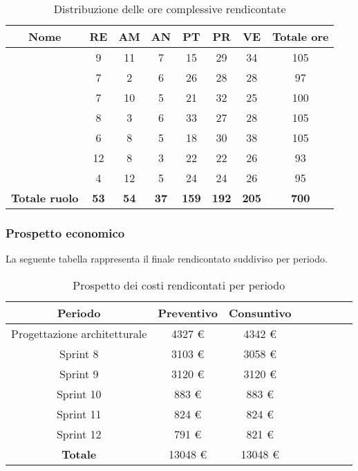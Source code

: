 \begin{table}[H]
		\begin{center}
			\setlength{\aboverulesep}{0pt}
			\setlength{\belowrulesep}{0pt}
			\setlength{\extrarowheight}{.75ex}
			\begin{tabular}{ c c c c c c c c }
				\rowcolor{AzzurroGruppo!30} 
				\textbf{Nome} & \textbf{RE} & \textbf{AM} & \textbf{AN} & \textbf{PT} & \textbf{PR} & \textbf{VE} & \textbf{Totale ore}\\
				\toprule
				\Davide{}    & 9 & 11 & 7 & 15 & 29 & 34 & 105 \\
				\Giosue{}    & 7 & 2 & 6 & 26 & 28 & 28 & 97\\
				\Francesco{} & 7 & 10 & 5 & 21 & 32 & 25 & 100\\
				\Daniele{}   & 8 & 3 & 6 & 33 & 27 & 28 & 105\\
				\Lucrezia{}  & 6 & 8 & 5 & 18 & 30 & 38 & 105\\
				\Matteo{}   & 12 & 8 & 3 & 22 & 22 & 26 & 93\\
				\Tommaso{}   & 4 & 12 & 5 & 24 & 24 & 26 & 95\\
				\textbf{Totale ruolo} & \textbf{53} & \textbf{54} & \textbf{37} & \textbf{159} & \textbf{192} & \textbf{205} & \textbf{700} \\
				\bottomrule
			\end{tabular}
			\caption{Distribuzione delle ore complessive rendicontate}
		\end{center}
	\end{table}
	
\subsubsection{Prospetto economico}
La seguente tabella rappresenta il finale rendicontato suddiviso per periodo.
\begin{table}[H]
		\begin{center}
			\setlength{\aboverulesep}{0pt}
			\setlength{\belowrulesep}{0pt}
			\setlength{\extrarowheight}{.75ex}
			\begin{tabular}{ c c c c c c c c }
				\rowcolor{AzzurroGruppo!30} 
				\textbf{Periodo} & \textbf{Preventivo} & \textbf{Consuntivo}\\
				\toprule
				Progettazione architetturale & 4327 \euro{} & 4342 \euro{} \\
				Sprint 8  & 3103 \euro{} & 3058 \euro{} \\
				Sprint 9  & 3120 \euro{} & 3120 \euro{} \\
				Sprint 10 & 883 \euro{} & 883 \euro{} \\
				Sprint 11 & 824 \euro{} & 824 \euro{} \\
				Sprint 12 & 791 \euro{} & 821 \euro{} \\
				\textbf{Totale} & 13048 \euro{} & 13048 \euro{} \\
				\bottomrule
			\end{tabular}
			\caption{Prospetto dei costi rendicontati per periodo}
		\end{center}
	\end{table}

